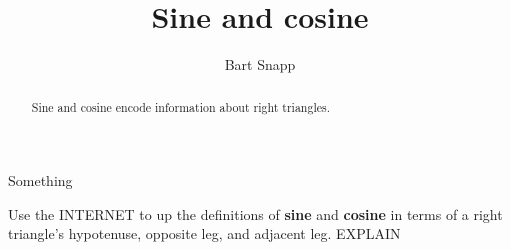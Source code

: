 \documentclass[noauthor,nooutcomes,12pt]{ximera}
\title{Sine and cosine}
\author{Bart Snapp}
\begin{document}
\begin{abstract}
  Sine and cosine encode information about right triangles.
\end{abstract}
\maketitle

\begin{listOutcomes}
\item Something
\end{listOutcomes}
\mynewpage




\begin{question}
  Use the INTERNET to up the definitions of \textbf{sine} and
  \textbf{cosine} in terms of a right triangle's hypotenuse, opposite
  leg, and adjacent leg. EXPLAIN
  
  
\end{question}
\mynewpage
\end{document}
